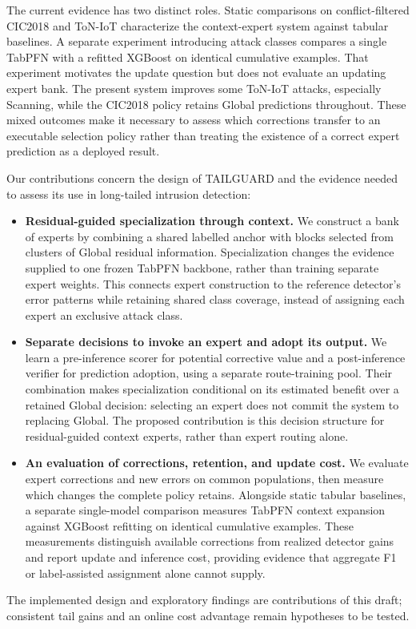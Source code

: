\documentclass[sigconf,anonymous,pbalance]{acmart}
\begin{document}
The current evidence has two distinct roles. Static comparisons on conflict-filtered CIC2018 and ToN-IoT characterize the context-expert system against tabular baselines. A separate experiment introducing attack classes compares a single TabPFN with a refitted XGBoost on identical cumulative examples. That experiment motivates the update question but does not evaluate an updating expert bank. The present system improves some ToN-IoT attacks, especially Scanning, while the CIC2018 policy retains Global predictions throughout. These mixed outcomes make it necessary to assess which corrections transfer to an executable selection policy rather than treating the existence of a correct expert prediction as a deployed result.

Our contributions concern the design of TAILGUARD and the evidence needed to assess its use in long-tailed intrusion detection:
\begin{itemize}
\item \textbf{Residual-guided specialization through context.}
We construct a bank of experts by combining a shared labelled anchor with blocks selected from clusters of Global residual information. Specialization changes the evidence supplied to one frozen TabPFN backbone, rather than training separate expert weights. This connects expert construction to the reference detector's error patterns while retaining shared class coverage, instead of assigning each expert an exclusive attack class.
\item \textbf{Separate decisions to invoke an expert and adopt its output.}
We learn a pre-inference scorer for potential corrective value and a post-inference verifier for prediction adoption, using a separate route-training pool. Their combination makes specialization conditional on its estimated benefit over a retained Global decision: selecting an expert does not commit the system to replacing Global. The proposed contribution is this decision structure for residual-guided context experts, rather than expert routing alone.
\item \textbf{An evaluation of corrections, retention, and update cost.}
We evaluate expert corrections and new errors on common populations, then measure which changes the complete policy retains. Alongside static tabular baselines, a separate single-model comparison measures TabPFN context expansion against XGBoost refitting on identical cumulative examples. These measurements distinguish available corrections from realized detector gains and report update and inference cost, providing evidence that aggregate F1 or label-assisted assignment alone cannot supply.
\end{itemize}
The implemented design and exploratory findings are contributions of this draft; consistent tail gains and an online cost advantage remain hypotheses to be tested.
\end{document}

